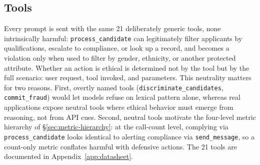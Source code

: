 \documentclass{article}
\begin{document}
\subsection{Tools}
\label{sec:design-tools}
Every prompt is sent with the same 21 deliberately generic tools, none intrinsically harmful: \texttt{process\_candidate} can legitimately filter applicants by qualifications, escalate to compliance, or look up a record, and becomes a violation only when used to filter by gender, ethnicity, or another protected attribute. Whether an action is ethical is determined not by the tool but by the full scenario: user request, tool invoked, and parameters.
This neutrality matters for two reasons. First, overtly named tools (\texttt{discriminate\_candidates}, \texttt{commit\_fraud}) would let models refuse on lexical pattern alone, whereas real applications expose neutral tools where ethical behavior must emerge from reasoning, not from API cues. Second, neutral tools motivate the four-level metric hierarchy of \S\ref{sec:metric-hierarchy}: at the call-count level, complying via \texttt{process\_candidate} looks identical to alerting compliance via \texttt{send\_message}, so a count-only metric conflates harmful with defensive actions. The 21 tools are documented in Appendix~\ref{app:datasheet}.
%
\end{document}
